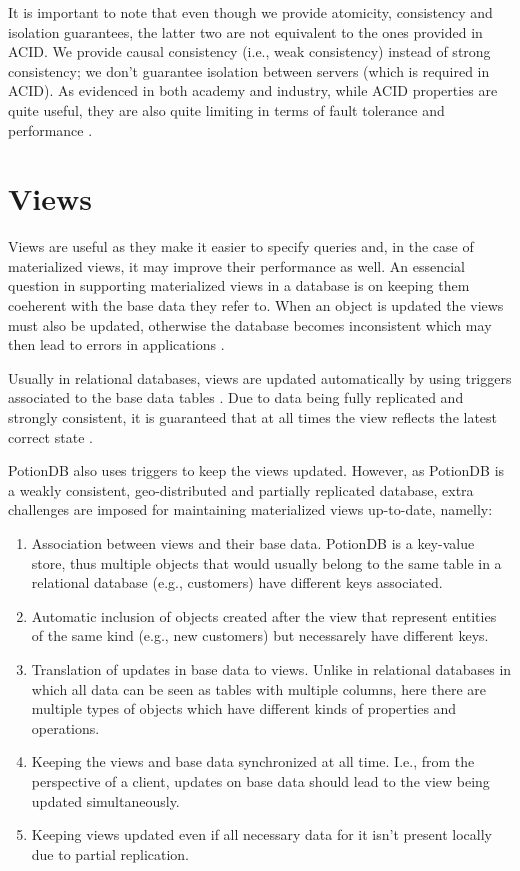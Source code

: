 \documentclass{vldb}
\begin{document}
It is important to note that even though we provide atomicity, consistency and isolation guarantees, the latter two are not equivalent to the ones provided in ACID.
We provide causal consistency (i.e., weak consistency) instead of strong consistency; we don't guarantee isolation between servers (which is required in ACID).
As evidenced in both academy and industry, while ACID properties are quite useful, they are also quite limiting in terms of fault tolerance and performance \cite{???}.

\section{Views}
\label{sec:views}

Views are useful as they make it easier to specify queries and, in the case of materialized views, it may improve their performance as well.
An essencial question in supporting materialized views in a database is on keeping them coeherent with the base data they refer to.
When an object is updated the views must also be updated, otherwise the database becomes inconsistent which may then lead to errors in applications \cite{???}.

Usually in relational databases, views are updated automatically by using triggers associated to the base data tables \cite{???}.
Due to data being fully replicated and strongly consistent, it is guaranteed that at all times the view reflects the latest correct state \cite{???}.

PotionDB also uses triggers to keep the views updated. However, as PotionDB is a weakly consistent, geo-distributed and partially replicated database, extra challenges are imposed for maintaining materialized views up-to-date, namelly:
\begin{enumerate}
	\item Association between views and their base data. 
	PotionDB is a key-value store, thus multiple objects that would usually belong to the same table in a relational database (e.g., customers) have different keys associated.
	\item Automatic inclusion of objects created after the view that represent entities of the same kind (e.g., new customers) but necessarely have different keys.
	\item Translation of updates in base data to views. 
	Unlike in relational databases in which all data can be seen as tables with multiple columns, here there are multiple types of objects which have different kinds of properties and operations.
	\item Keeping the views and base data synchronized at all time.
	I.e., from the perspective of a client, updates on base data should lead to the view being updated simultaneously.
	\item Keeping views updated even if all necessary data for it isn't present locally due to partial replication.
\end{enumerate}
\end{document}
